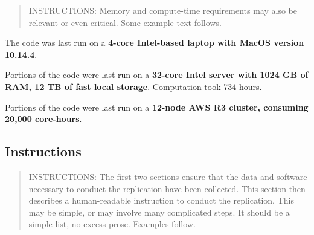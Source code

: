 \documentclass[
]{article}
\begin{document}
\begin{quote}
INSTRUCTIONS: Memory and compute-time requirements may also be relevant
or even critical. Some example text follows.
\end{quote}

The code was last run on a \textbf{4-core Intel-based laptop with MacOS
version 10.14.4}.

Portions of the code were last run on a \textbf{32-core Intel server
with 1024 GB of RAM, 12 TB of fast local storage}. Computation took 734
hours.

Portions of the code were last run on a \textbf{12-node AWS R3 cluster,
consuming 20,000 core-hours}.

\hypertarget{instructions}{%
\subsection{Instructions}\label{instructions}}

\begin{quote}
INSTRUCTIONS: The first two sections ensure that the data and software
necessary to conduct the replication have been collected. This section
then describes a human-readable instruction to conduct the replication.
This may be simple, or may involve many complicated steps. It should be
a simple list, no excess prose. Examples follow.
\end{quote}
\end{document}
